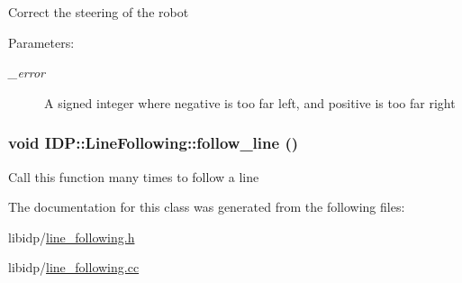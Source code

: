 Correct the steering of the robot \begin{Desc}
\item[Parameters:]
\begin{description}
\item[{\em \_\-error}]A signed integer where negative is too far left, and positive is too far right \end{description}
\end{Desc}
\hypertarget{classIDP_1_1LineFollowing_35c80e04729e98dfa927159610605649}{
\subsubsection[{follow\_\-line}]{\setlength{\rightskip}{0pt plus 5cm}void IDP::LineFollowing::follow\_\-line ()}}
\label{classIDP_1_1LineFollowing_35c80e04729e98dfa927159610605649}


Call this function many times to follow a line 

The documentation for this class was generated from the following files:\begin{CompactItemize}
\item 
libidp/\hyperlink{line__following_8h}{line\_\-following.h}\item 
libidp/\hyperlink{line__following_8cc}{line\_\-following.cc}\end{CompactItemize}
